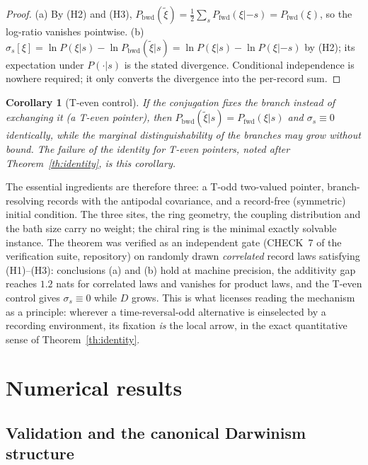 \documentclass[11pt]{article}
\newtheorem{corollary}{Corollary}
\begin{document}
\begin{proof}
(a) By (H2) and (H3), $P_{\mathrm{bwd}}(\tilde\xi) = \tfrac12\sum_s P_{\mathrm{fwd}}(\xi|{-s}) = P_{\mathrm{fwd}}(\xi)$, so the log-ratio vanishes pointwise. (b) $\sigma_s[\xi] = \ln P(\xi|s) - \ln P_{\mathrm{bwd}}(\tilde\xi|s) = \ln P(\xi|s) - \ln P(\xi|{-s})$ by (H2); its expectation under $P(\cdot|s)$ is the stated divergence. Conditional independence is nowhere required; it only converts the divergence into the per-record sum.
\end{proof}

\begin{corollary}[T-even control]\label{cor:teven}
If the conjugation fixes the branch instead of exchanging it (a T-even pointer), then $P_{\mathrm{bwd}}(\tilde\xi|s) = P_{\mathrm{fwd}}(\xi|s)$ and $\sigma_s \equiv 0$ identically, while the marginal distinguishability of the branches may grow without bound. The failure of the identity for T-even pointers, noted after Theorem~\ref{th:identity}, is this corollary.
\end{corollary}

The essential ingredients are therefore three: a T-odd two-valued pointer, branch-resolving records with the antipodal covariance, and a record-free (symmetric) initial condition. The three sites, the ring geometry, the coupling distribution and the bath size carry no weight; the chiral ring is the minimal exactly solvable instance. The theorem was verified as an independent gate (CHECK~7 of the verification suite, repository) on randomly drawn \emph{correlated} record laws satisfying (H1)--(H3): conclusions (a) and (b) hold at machine precision, the additivity gap reaches $1.2$ nats for correlated laws and vanishes for product laws, and the T-even control gives $\sigma_s \equiv 0$ while $D$ grows. This is what licenses reading the mechanism as a principle: wherever a time-reversal-odd alternative is einselected by a recording environment, its fixation \emph{is} the local arrow, in the exact quantitative sense of Theorem~\ref{th:identity}.

\section{Numerical results}\label{sec:numerics}

\subsection{Validation and the canonical Darwinism structure}
\end{document}
